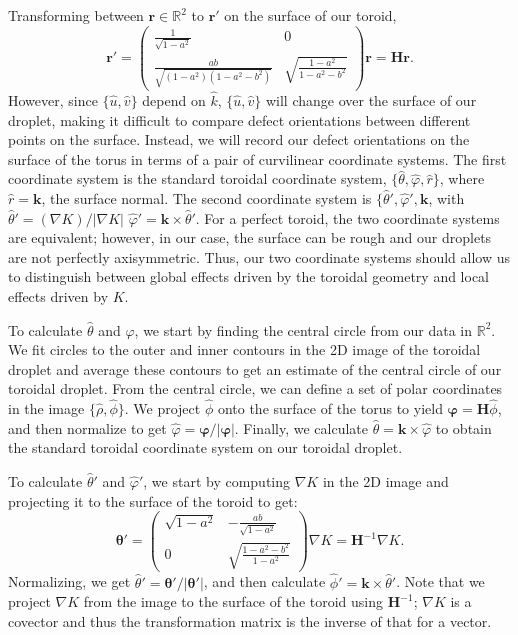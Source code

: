 Transforming between $\mathbf{r} \in \mathbb{R}^2$ to $\mathbf{r}'$ on the surface of our toroid,
\begin{equation}
  \mathbf{r}' =
  \begin{pmatrix}
  \frac{1}{\sqrt{1-a^2}} & 0 \\
  \frac{ab}{\sqrt{(1-a^2)(1-a^2-b^2)}} & \sqrt{\frac{1-a^2}{1-a^2-b^2}}
  \end{pmatrix}
  \mathbf{r} = \bm{H}\mathbf{r}.
\end{equation}
However, since $\{ \hat{u},\hat{v}\}$ depend on $\hat{k}$, $\{ \hat{u},\hat{v}\}$ will change over the surface of our droplet, making it difficult to compare defect orientations between different points on the surface.
Instead, we will record our defect orientations on the surface of the torus in terms of a pair of curvilinear coordinate systems.
The first coordinate system is the standard toroidal coordinate system, $\{\hat{\theta}, \hat{\varphi}, \hat{r}  \}$, where $\hat{r} = \mathbf{k}$, the surface normal.
The second coordinate system is $\{\hat{\theta}', \hat{\varphi}',\mathbf{k}$, with $\hat{\theta}' = (\nabla K)/|\nabla K|$ $\hat{\varphi}' = \mathbf{k} \times \hat{\theta}'$.
For a perfect toroid, the two coordinate systems are equivalent; however, in our case, the surface can be rough and our droplets are not perfectly axisymmetric.
Thus, our two coordinate systems should allow us to distinguish between global effects driven by the toroidal geometry and local effects driven by $K$.

To calculate $\hat{\theta}$ and $\hat{\varphi}$, we start by finding the central circle from our data in $\mathbb{R}^2$.
We fit circles to the outer and inner contours in the 2D image of the toroidal droplet and average these contours to get an estimate of the central circle of our toroidal droplet.
From the central circle, we can define a set of polar coordinates in the image $\{\hat{\rho}, \hat{\phi}\}$.
We project $\hat{\phi}$ onto the surface of the torus to yield $\bm{\varphi} = \bm{H}\hat{\phi}$, and then normalize to get $\hat{\varphi} = \bm{\varphi}/|\bm{\varphi}|$.
Finally, we calculate $\hat{\theta} = \mathbf{k} \times \hat{\varphi}$ to obtain the standard toroidal coordinate system on our toroidal droplet.

To calculate $\hat{\theta}'$ and $\hat{\varphi}'$, we start by computing $\nabla K$ in the 2D image and projecting it to the surface of the toroid to get:
\begin{equation}
  \bm{\theta}' =
  \begin{pmatrix}
    \sqrt{1-a^2} & -\frac{ab}{\sqrt{1-a^2}} \\
    0 & \sqrt{\frac{1-a^2-b^2}{1-a^2}}
  \end{pmatrix}
  \nabla K = \bm{H}^{-1} \nabla K.
\end{equation}
Normalizing, we get $\hat{\theta}' = \bm{\theta}'/|\bm{\theta}'|$, and then calculate $\hat{\phi}' = \mathbf{k} \times \hat{\theta}'$.
Note that we project $\nabla K$ from the image to the surface of the toroid using $\bm{H}^{-1}$; $\nabla K$ is a covector and thus the transformation matrix is the inverse of that for a vector.

